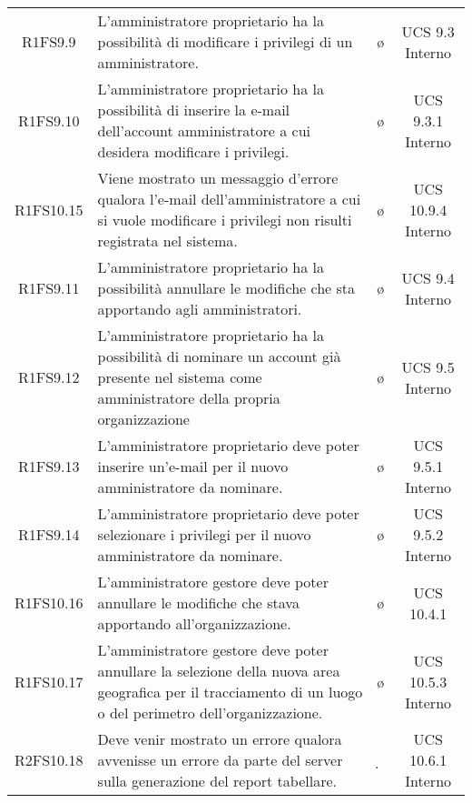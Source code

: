 {\begin{longtable}{ c C{6.5cm} c c}
R1FS9.9 & L'amministratore proprietario ha la possibilità di modificare i privilegi di un amministratore. & \o & UCS 9.3 Interno\\

R1FS9.10 & L'amministratore proprietario ha la possibilità di inserire la e-mail dell'account amministratore a cui desidera modificare i privilegi. & \o & UCS 9.3.1 Interno\\

R1FS10.15 & Viene mostrato un messaggio d'errore qualora l'e-mail dell'amministratore a cui si vuole modificare i privilegi non risulti registrata nel sistema. & \o & UCS 10.9.4 Interno\\

R1FS9.11 & L'amministratore proprietario ha la possibilità annullare le modifiche che sta apportando agli amministratori. & \o & UCS 9.4 Interno\\

R1FS9.12 & L'amministratore proprietario ha la possibilità di nominare un account già presente nel sistema come amministratore della propria organizzazione & \o & UCS 9.5 Interno\\

R1FS9.13 & L'amministratore proprietario deve poter inserire un'e-mail per il nuovo amministratore da nominare. & \o & UCS 9.5.1 Interno\\

R1FS9.14 & L'amministratore proprietario deve poter selezionare i privilegi per il nuovo amministratore da nominare. & \o & UCS 9.5.2 Interno\\

R1FS10.16 & L'amministratore gestore deve poter annullare le modifiche che stava apportando all'organizzazione. & \o & UCS 10.4.1\\

R1FS10.17 & L'amministratore gestore deve poter annullare la selezione della nuova area geografica per il tracciamento di un luogo o del perimetro dell'organizzazione. & \o & UCS 10.5.3 Interno\\

R2FS10.18 & Deve venir mostrato un errore qualora avvenisse un errore da parte del server sulla generazione del report tabellare. & \d & UCS 10.6.1 Interno\\

\end{longtable}
}